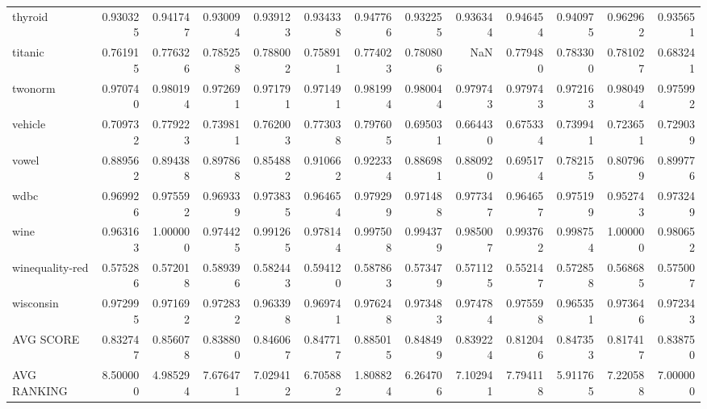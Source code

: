 \begin{tabular}{lrrrrrrrrrrrr}
thyroid         &   0.930325 &  0.941747 &  0.930094 &  0.939123 &  0.934338 &  0.947766 &  0.932255 &  0.936344 &  0.946454 &  0.940975 &  0.962962 &  0.935651 \\
titanic         &   0.761915 &  0.776326 &  0.785258 &  0.788002 &  0.758911 &  0.774023 &  0.780806 &       NaN &  0.779480 &  0.783300 &  0.781027 &  0.683241 \\
twonorm         &   0.970740 &  0.980194 &  0.972691 &  0.971791 &  0.971491 &  0.981994 &  0.980044 &  0.979743 &  0.979743 &  0.972163 &  0.980494 &  0.975992 \\
vehicle         &   0.709732 &  0.779223 &  0.739811 &  0.762003 &  0.773038 &  0.797605 &  0.695031 &  0.664430 &  0.675334 &  0.739941 &  0.723651 &  0.729039 \\
vowel           &   0.889562 &  0.894388 &  0.897868 &  0.854882 &  0.910662 &  0.922334 &  0.886981 &  0.880920 &  0.695174 &  0.782155 &  0.807969 &  0.899776 \\
wdbc            &   0.969926 &  0.975592 &  0.969339 &  0.973835 &  0.964654 &  0.979299 &  0.971488 &  0.977347 &  0.964657 &  0.975199 &  0.952743 &  0.973249 \\
wine            &   0.963163 &  1.000000 &  0.974425 &  0.991265 &  0.978144 &  0.997508 &  0.994379 &  0.985007 &  0.993762 &  0.998754 &  1.000000 &  0.980652 \\
winequality-red &   0.575286 &  0.572018 &  0.589396 &  0.582443 &  0.594120 &  0.587863 &  0.573479 &  0.571125 &  0.552147 &  0.572858 &  0.568685 &  0.575007 \\
wisconsin       &   0.972995 &  0.971692 &  0.972832 &  0.963398 &  0.969741 &  0.976248 &  0.973483 &  0.974784 &  0.975598 &  0.965351 &  0.973646 &  0.972343 \\
AVG SCORE       &   0.832747 &  0.856078 &  0.838800 &  0.846067 &  0.847717 &  0.885015 &  0.848499 &  0.839224 &  0.812046 &  0.847353 &  0.817417 &  0.838750 \\
AVG RANKING     &   8.500000 &  4.985294 &  7.676471 &  7.029412 &  6.705882 &  1.808824 &  6.264706 &  7.102941 &  7.794118 &  5.911765 &  7.220588 &  7.000000 \\
\bottomrule
\end{tabular}
